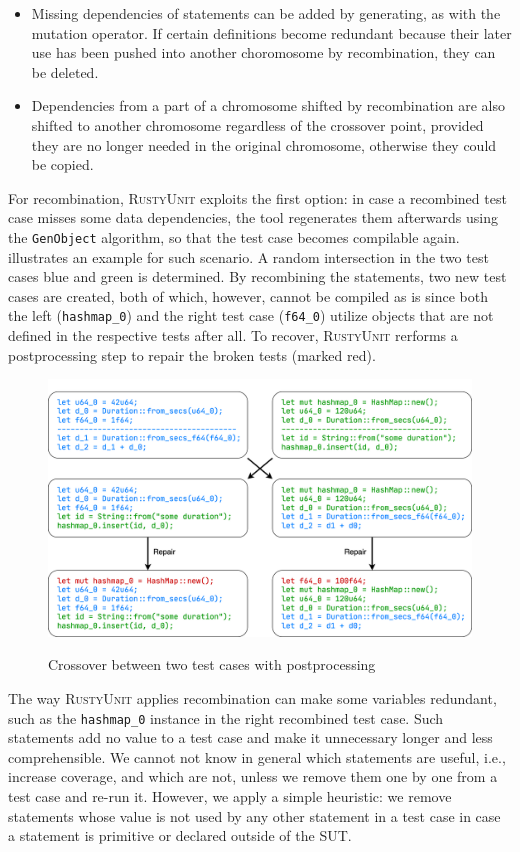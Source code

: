 \documentclass[paper=a4,%
  twoside,%
  BCOR4mm,%
  abstract=true,%
  toc=bibliography,%
  chapterprefix=true,%
  toc=bibliographynumbered,%
  open=right,%
  english,%
  pagesize=pdftex]{scrreprt}
\newcommand{\tech}{\textsc{RustyUnit}\xspace}
\newcommand{\sut}{\ac{SUT}\xspace}
\begin{document}
\begin{itemize}
    \item Missing dependencies of statements can be added by generating, as with the mutation operator. If certain definitions become redundant because their later use has been pushed into another choromosome by recombination, they can be deleted.
    \item Dependencies from a part of a chromosome shifted by recombination are also shifted to another chromosome regardless of the crossover point, provided they are no longer needed in the original chromosome, otherwise they could be copied.
\end{itemize}

For recombination, \tech exploits the first option: in case a recombined test case misses some data dependencies, the tool regenerates them afterwards using the \texttt{GenObject} algorithm, so that the test case becomes compilable again.  illustrates an example for such scenario. A random intersection in the two test cases blue and green is determined. By recombining the statements, two new test cases are created, both of which, however, cannot be compiled as is since both the left (\texttt{hashmap\string_0}) and the right test case (\texttt{f64\string_0}) utilize objects that are not defined in the respective tests after all. To recover, \tech rerforms a postprocessing step to repair the broken tests (marked red).

\begin{figure}[h]
\caption{Crossover between two test cases with postprocessing}
\centering
\includegraphics[width=\textwidth]{crossover}
\label{fig:crossover-example}
\end{figure}

The way \tech applies recombination can make some variables redundant, such as the \texttt{hashmap\string_0} instance in the right recombined test case. Such statements add no value to a test case and make it unnecessary longer and less comprehensible. We cannot not know in general which statements are useful, i.e., increase coverage, and which are not, unless we remove them one by one from a test case and re-run it. However, we apply a simple heuristic: we remove statements whose value is not used by any other statement in a test case in case a statement is primitive or declared outside of the \sut.
\end{document}
